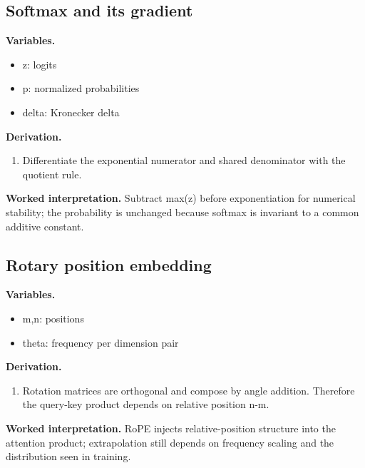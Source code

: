 \subsection{Softmax and its gradient}
\textbf{Variables.}\begin{itemize}
\item z: logits
\item p: normalized probabilities
\item delta: Kronecker delta
\end{itemize}
\textbf{Derivation.}\begin{derivation}\begin{enumerate}
\item Differentiate the exponential numerator and shared denominator with the quotient rule.
\end{enumerate}\end{derivation}
\textbf{Worked interpretation.} Subtract max(z) before exponentiation for numerical stability; the probability is unchanged because softmax is invariant to a common additive constant.
\subsection{Rotary position embedding}
\textbf{Variables.}\begin{itemize}
\item m,n: positions
\item theta: frequency per dimension pair
\end{itemize}
\textbf{Derivation.}\begin{derivation}\begin{enumerate}
\item Rotation matrices are orthogonal and compose by angle addition. Therefore the query-key product depends on relative position n-m.
\end{enumerate}\end{derivation}
\textbf{Worked interpretation.} RoPE injects relative-position structure into the attention product; extrapolation still depends on frequency scaling and the distribution seen in training.
